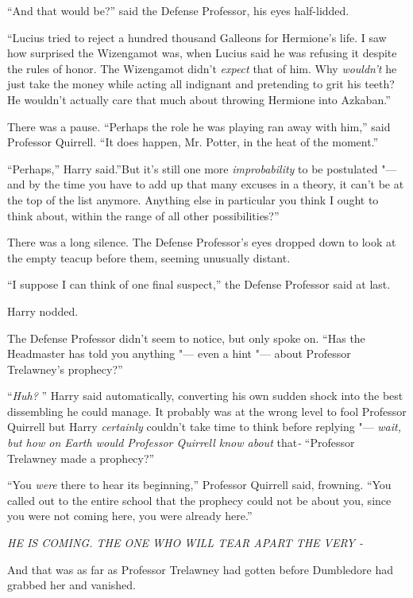 ``And that would be?'' said the Defense Professor, his eyes half-lidded.

``Lucius tried to reject a hundred thousand Galleons for Hermione's life.
I saw how surprised the Wizengamot was, when Lucius said he was refusing
it despite the rules of honor. The Wizengamot didn't \emph{expect} that
of him. Why \emph{wouldn't} he just take the money while acting all
indignant and pretending to grit his teeth? He wouldn't actually care
that much about throwing Hermione into Azkaban.''

There was a pause. ``Perhaps the role he was playing ran away with
him,'' said Professor Quirrell. ``It does happen, Mr. Potter, in the
heat of the moment.''

``Perhaps,'' Harry said.''But it's still one more \emph{improbability}
to be postulated "--- and by the time you have to add up that many excuses
in a theory, it can't be at the top of the list anymore. Anything else
in particular you think I ought to think about, within the range of all
other possibilities?''

There was a long silence. The Defense Professor's eyes dropped down to
look at the empty teacup before them, seeming unusually distant.

``I suppose I can think of one final suspect,'' the Defense Professor
said at last.

Harry nodded.

The Defense Professor didn't seem to notice, but only spoke on. ``Has
the Headmaster has told you anything "--- even a hint "--- about Professor
Trelawney's prophecy?''

``\emph{Huh?} '' Harry said automatically, converting his own sudden shock
into the best dissembling he could manage. It probably was at the wrong
level to fool Professor Quirrell but Harry \emph{certainly} couldn't
take time to think before replying "--- \emph{wait, but how on Earth would
Professor Quirrell know about} that\emph{-} ``Professor Trelawney made a
prophecy?''

``You \emph{were} there to hear its beginning,'' Professor Quirrell said,
frowning. ``You called out to the entire school that the prophecy could
not be about you, since you were not coming here, you were already
here.''

\emph{HE IS COMING. THE ONE WHO WILL TEAR APART THE VERY -}

And that was as far as Professor Trelawney had gotten before Dumbledore
had grabbed her and vanished.

